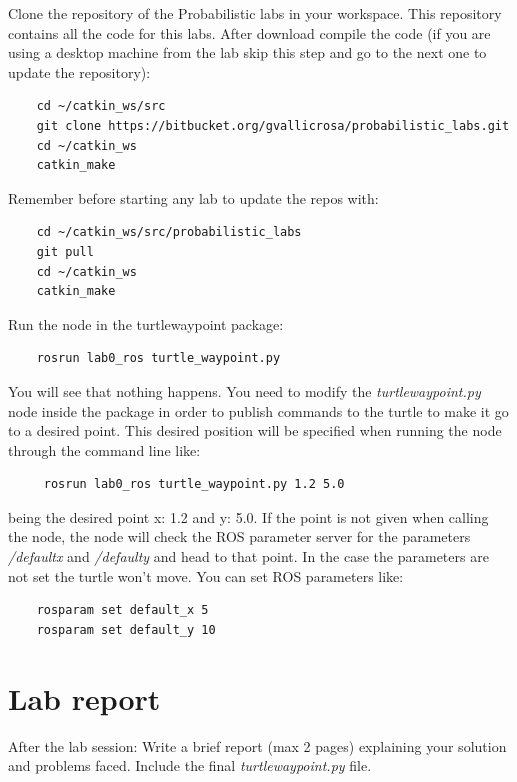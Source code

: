 \documentclass[a4paper,10pt]{article}
\begin{document}
\noindent
Clone the repository of the Probabilistic labs in your workspace. This repository contains all the code for this labs. After download compile the code (if you are using a desktop machine from the lab skip this step and go to the next one to update the repository):
\begin{verbatim}
    cd ~/catkin_ws/src
    git clone https://bitbucket.org/gvallicrosa/probabilistic_labs.git
    cd ~/catkin_ws
    catkin_make
\end{verbatim}
\noindent Remember before starting any lab to update the repos with:
\begin{verbatim}
    cd ~/catkin_ws/src/probabilistic_labs
    git pull
    cd ~/catkin_ws
    catkin_make
\end{verbatim}
\noindent
Run the node in the turtle{\textunderscore}waypoint package:
\begin{verbatim}
    rosrun lab0_ros turtle_waypoint.py
\end{verbatim}
You will see that nothing happens. You need to modify the \emph{turtle{\textunderscore}waypoint.py} node inside the package in order to publish commands to the turtle to make it go to a desired point. This desired position will be specified when running the node through the command line like:
\begin{verbatim}
 	 rosrun lab0_ros turtle_waypoint.py 1.2 5.0
\end{verbatim}
being the desired point x: 1.2 and y: 5.0. If the point is not given when calling the node, the node will check the ROS parameter server for the parameters \emph{/default{\textunderscore}x} and \emph{/default{\textunderscore}y} and head to that point. In the case the parameters are not set the turtle won't move. You can set ROS parameters like:
\begin{verbatim}
    rosparam set default_x 5
    rosparam set default_y 10
\end{verbatim}

\section{Lab report}

After the lab session: Write a brief report (max 2 pages) explaining your solution and problems faced. Include the final \emph{turtle{\textunderscore}waypoint.py} file.
\end{document}

